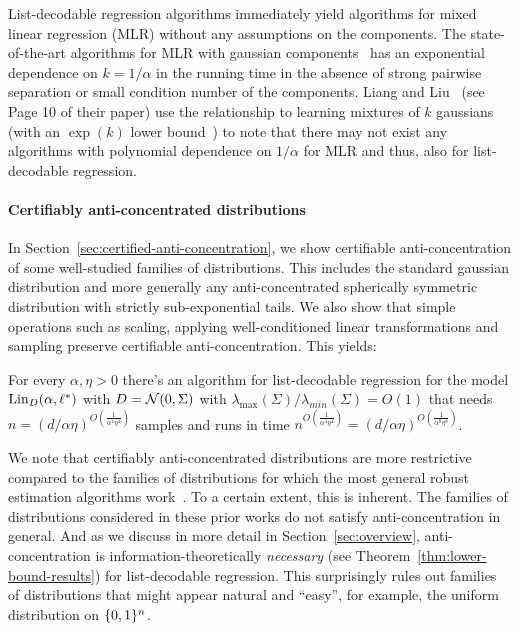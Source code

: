 \begin{remark}
List-decodable regression algorithms immediately yield algorithms for mixed linear regression (MLR) without any assumptions on the components. The state-of-the-art algorithms for MLR with gaussian components~\cite{DBLP:conf/colt/LiL18,DBLP:conf/aistats/SedghiJA16} has an exponential dependence on $k=1/\alpha$ in the running time in the absence of strong pairwise separation or small condition number of the components. Liang and Liu~\cite{DBLP:conf/colt/LiL18} (see Page 10 of their paper) use the relationship to learning mixtures of $k$ gaussians (with an $\exp(k)$ lower bound~\cite{DBLP:conf/focs/MoitraV10}) to note that there may not exist any algorithms with polynomial dependence on $1/\alpha$ for MLR and thus, also for list-decodable regression. 
\end{remark}


\paragraph{Certifiably anti-concentrated distributions} In Section~\ref{sec:certified-anti-concentration}, we show certifiable anti-concentration of some well-studied families of distributions. This includes the standard gaussian distribution and more generally any anti-concentrated spherically symmetric distribution with strictly sub-exponential tails. We also show that simple operations such as scaling, applying well-conditioned linear transformations and sampling preserve certifiable anti-concentration. This yields:
\begin{corollary}
For every $\alpha, \eta > 0$ there's an algorithm for list-decodable regression for the model $\mathrm{Lin}_D(\alpha,\ell^*)$ with $D = \mathcal N(0,\Sigma)$ with $\lambda_{\max}(\Sigma)/\lambda_{min}(\Sigma) = O(1)$ that needs $n = (d/\alpha \eta)^{O\left(\frac{1}{\alpha^4 \eta^4}\right)}$  samples and runs in time $n^{O\left(\frac{1}{\alpha^4 \eta^4}\right)} = (d/\alpha \eta)^{O\left(\frac{1}{\alpha^8 \eta^8}\right)}$.
\end{corollary} 

We note that certifiably anti-concentrated distributions are more restrictive compared to the families of distributions for which the most general robust estimation algorithms work~\cite{2017KS,KothariSteinhardt17,DBLP:conf/colt/KlivansKM18}. To a certain extent, this is inherent. The families of distributions considered in these prior works do not satisfy anti-concentration in general.  And as we discuss in more detail in Section~\ref{sec:overview}, anti-concentration is information-theoretically \emph{necessary} (see Theorem~\ref{thm:lower-bound-results}) for list-decodable regression. This surprisingly rules out families of distributions that might appear natural and ``easy'', for example, the uniform distribution on $\{0,1\}^n$.

